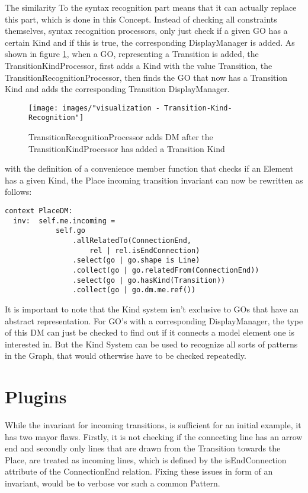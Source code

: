 The similarity To the syntax recognition part means that it can actually replace this part, which is done in this Concept. Instead of checking all constraints themselves, syntax recognition processors, only just check if a given GO has a certain Kind and if this is true, the corresponding DisplayManager is added. As shown in figure \ref{fig:Transition-Kind-Recognition}, when a GO, representing a Transition is added, the TransitionKindProcessor, first adds a Kind with the value Transition, the TransitionRecognitionProcessor, then finds the GO that now has a Transition Kind and adds the corresponding Transition DisplayManager.

\begin{figure}[ht]
\centering
\texttt{[image: images/"visualization - Transition-Kind-Recognition"]}
\caption{TransitionRecognitionProcessor adds DM after the TransitionKindProcessor has added a Transition Kind}
\label{fig:Transition-Kind-Recognition}
\end{figure}

with the definition of a convenience member function that checks if an Element has a given Kind, the Place incoming transition invariant can now be rewritten as follows: 
\begin{lstlisting}[language=OCL]
  context PlaceDM: 
  inv:  self.me.incoming = 
            self.go
                .allRelatedTo(ConnectionEnd, 
                    rel | rel.isEndConnection)
                .select(go | go.shape is Line)
                .collect(go | go.relatedFrom(ConnectionEnd))
                .select(go | go.hasKind(Transition))
                .collect(go | go.dm.me.ref())
\end{lstlisting}


It is important to note that the Kind system isn't exclusive to GOs that have an abstract representation. For GO's with a corresponding DisplayManager, the type of this DM can just be checked to find out if it connects a model element one is interested in. But the Kind System can be used to recognize all sorts of patterns in the Graph, that would otherwise have to be checked repeatedly.

\section{Plugins}

While the invariant for incoming transitions, is sufficient for an initial example, it has two mayor flaws. Firstly, it is not checking if the connecting line has an arrow end and secondly only lines that are drawn from the Transition towards the Place, are treated as incoming lines, which is defined by the isEndConnection attribute of the ConnectionEnd relation. Fixing these issues in form of an invariant, would be to verbose vor such a common Pattern.

